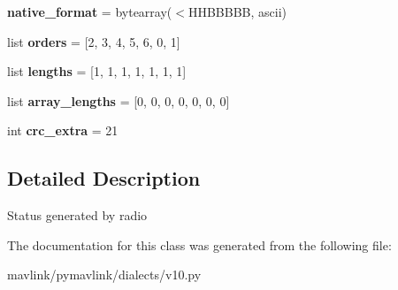 \begin{DoxyCompactItemize}
\mbox{\label{classpymavlink_1_1dialects_1_1v10_1_1MAVLink__radio__message_a219f0de216df7cf89a6bc8c9d5bafc89}} 
{\bfseries native\+\_\+format} = bytearray(\textquotesingle{}$<$H\+H\+B\+B\+B\+BB\textquotesingle{}, \textquotesingle{}ascii\textquotesingle{})
\item 
\mbox{\label{classpymavlink_1_1dialects_1_1v10_1_1MAVLink__radio__message_a2acc558f4816a6198839718770675b9d}} 
list {\bfseries orders} = \mbox{[}2, 3, 4, 5, 6, 0, 1\mbox{]}
\item 
\mbox{\label{classpymavlink_1_1dialects_1_1v10_1_1MAVLink__radio__message_a58e5177c5970dbee9e3cc7cc8d36440e}} 
list {\bfseries lengths} = \mbox{[}1, 1, 1, 1, 1, 1, 1\mbox{]}
\item 
\mbox{\label{classpymavlink_1_1dialects_1_1v10_1_1MAVLink__radio__message_a427587f61aaad5a8c78765f077b33a50}} 
list {\bfseries array\+\_\+lengths} = \mbox{[}0, 0, 0, 0, 0, 0, 0\mbox{]}
\item 
\mbox{\label{classpymavlink_1_1dialects_1_1v10_1_1MAVLink__radio__message_ac6a61406f978b32b8f51ce7faed355ac}} 
int {\bfseries crc\+\_\+extra} = 21
\end{DoxyCompactItemize}


\subsection{Detailed Description}
\begin{DoxyVerb}Status generated by radio
\end{DoxyVerb}
 

The documentation for this class was generated from the following file\+:\begin{DoxyCompactItemize}
\item 
mavlink/pymavlink/dialects/v10.\+py\end{DoxyCompactItemize}
